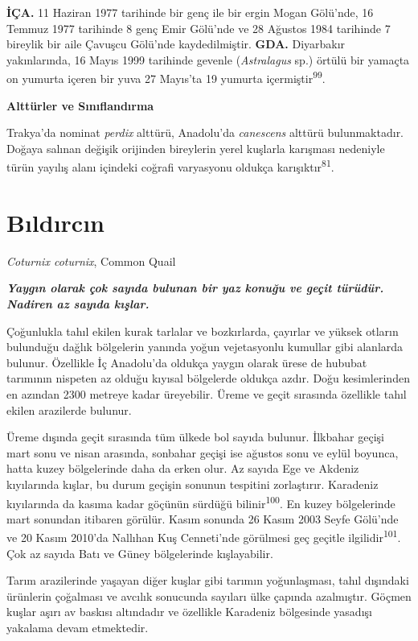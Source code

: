 \documentclass[
  letterpaper,
  DIV=11,
  numbers=noendperiod]{scrreprt}
\begin{document}
\textbf{İÇA.} 11 Haziran 1977 tarihinde bir genç ile bir ergin Mogan
Gölü'nde, 16 Temmuz 1977 tarihinde 8 genç Emir Gölü'nde ve 28 Ağustos
1984 tarihinde 7 bireylik bir aile Çavuşcu Gölü'nde kaydedilmiştir.
\textbf{GDA.} Diyarbakır yakınlarında, 16 Mayıs 1999 tarihinde gevenle
(\emph{Astralagus} sp.) örtülü bir yamaçta on yumurta içeren bir yuva 27
Mayıs'ta 19 yumurta içermiştir\textsuperscript{99}.

\textbf{Alttürler ve Sınıflandırma}

Trakya'da nominat \emph{perdix} alttürü, Anadolu'da \emph{canescens}
alttürü bulunmaktadır. Doğaya salınan değişik orijinden bireylerin yerel
kuşlarla karışması nedeniyle türün yayılış alanı içindeki coğrafi
varyasyonu oldukça karışıktır\textsuperscript{81}.

\section{Bıldırcın}\label{bux131ldux131rcux131n}

\emph{Coturnix coturnix}, Common Quail

\textbf{\emph{Yaygın olarak çok sayıda bulunan bir yaz konuğu ve geçit
türüdür. Nadiren az sayıda kışlar.}}

Çoğunlukla tahıl ekilen kurak tarlalar ve bozkırlarda, çayırlar ve
yüksek otların bulunduğu dağlık bölgelerin yanında yoğun vejetasyonlu
kumullar gibi alanlarda bulunur. Özellikle İç Anadolu'da oldukça yaygın
olarak ürese de hububat tarımının nispeten az olduğu kıyısal bölgelerde
oldukça azdır. Doğu kesimlerinden en azından 2300 metreye kadar
üreyebilir. Üreme ve geçit sırasında özellikle tahıl ekilen arazilerde
bulunur.

Üreme dışında geçit sırasında tüm ülkede bol sayıda bulunur. İlkbahar
geçişi mart sonu ve nisan arasında, sonbahar geçişi ise ağustos sonu ve
eylül boyunca, hatta kuzey bölgelerinde daha da erken olur. Az sayıda
Ege ve Akdeniz kıyılarında kışlar, bu durum geçişin sonunun tespitini
zorlaştırır. Karadeniz kıyılarında da kasıma kadar göçünün sürdüğü
bilinir\textsuperscript{100}. En kuzey bölgelerinde mart sonundan
itibaren görülür. Kasım sonunda 26 Kasım 2003 Seyfe Gölü'nde ve 20 Kasım
2010'da Nallıhan Kuş Cenneti'nde görülmesi geç geçitle
ilgilidir\textsuperscript{101}. Çok az sayıda Batı ve Güney bölgelerinde
kışlayabilir.

Tarım arazilerinde yaşayan diğer kuşlar gibi tarımın yoğunlaşması, tahıl
dışındaki ürünlerin çoğalması ve avcılık sonucunda sayıları ülke çapında
azalmıştır. Göçmen kuşlar aşırı av baskısı altındadır ve özellikle
Karadeniz bölgesinde yasadışı yakalama devam etmektedir.
\end{document}
